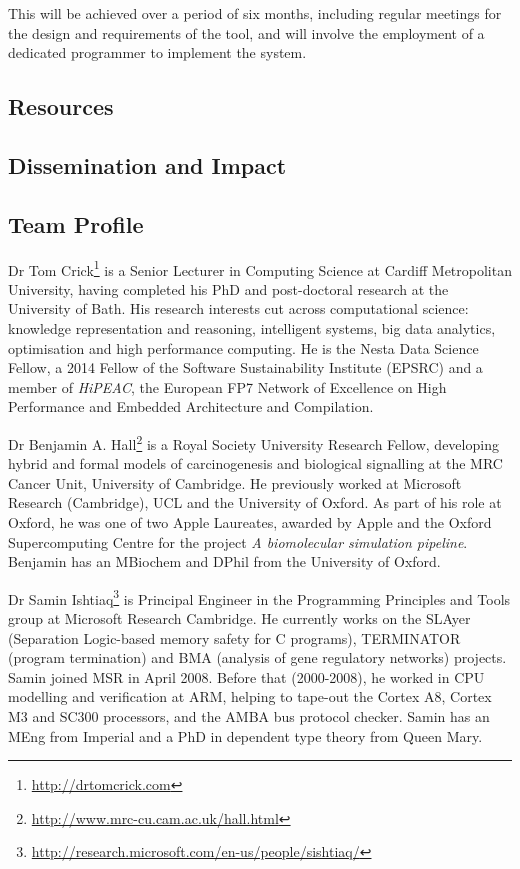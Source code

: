 \documentclass[a4paper,11pt]{article}
\begin{document}
This will be achieved over a period of six months, including regular
meetings for the design and requirements of the tool, and will involve
the employment of a dedicated programmer to implement the system.

\subsection*{Resources}

\subsection*{Dissemination and Impact}

\subsection*{Team Profile}

Dr Tom Crick\footnote{\url{http://drtomcrick.com}} is a Senior Lecturer in
Computing Science at Cardiff Metropolitan University, having completed
his PhD and post-doctoral research at the University of Bath. His
research interests cut across computational science: knowledge
representation and reasoning, intelligent systems, big data analytics,
optimisation and high performance computing.  He is the Nesta Data
Science Fellow, a 2014 Fellow of the Software Sustainability Institute
(EPSRC) and a member of {\emph{HiPEAC}}, the European FP7 Network of
Excellence on High Performance and Embedded Architecture and
Compilation.

Dr Benjamin A. Hall\footnote{\url{http://www.mrc-cu.cam.ac.uk/hall.html}}
is a Royal Society University Research Fellow, developing hybrid and
formal models of carcinogenesis and biological signalling at the MRC
Cancer Unit, University of Cambridge. He previously worked at
Microsoft Research (Cambridge), UCL and the University of Oxford. As
part of his role at Oxford, he was one of two Apple
Laureates, awarded by Apple and the Oxford Supercomputing Centre for
the project {\emph{A biomolecular simulation pipeline}}. Benjamin has an
MBiochem and DPhil from the University of Oxford.

Dr Samin
Ishtiaq\footnote{\url{http://research.microsoft.com/en-us/people/sishtiaq/}}
is Principal Engineer in the Programming Principles and Tools group at
Microsoft Research Cambridge. He currently works on the SLAyer
(Separation Logic-based memory safety for C programs), TERMINATOR
(program termination) and BMA (analysis of gene regulatory networks)
projects. Samin joined MSR in April 2008. Before that (2000-2008), he
worked in CPU modelling and verification at ARM, helping to tape-out
the Cortex A8, Cortex M3 and SC300 processors, and the AMBA bus
protocol checker. Samin has an MEng from Imperial and a PhD in
dependent type theory from Queen Mary.



\end{document}
